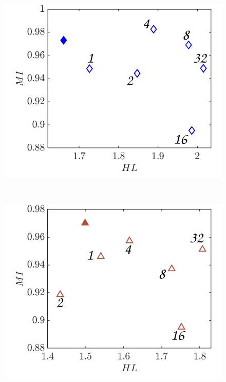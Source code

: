 \documentclass[%
 aip,
 amsmath,amssymb,
 reprint,
]{revtex4-1}
\begin{document}
\begin{figure}
\begin{center}
\begin{minipage}[c]{0.3\linewidth}
			\includegraphics[width=1\linewidth,trim=0.5cm 0cm 0cm 0cm,clip]{Figures/MI_8h_HL_3.png}
		\end{minipage}\\
		\begin{minipage}[c]{0.3\linewidth}
			\includegraphics[width=1\linewidth,trim=0.5cm 0cm 0cm 0cm,clip]{Figures/MI_8h_HL_4.png}
		\end{minipage}
		\begin{minipage}[c]{0.3\linewidth}

\end{minipage}
\end{center}
\end{figure}
\end{document}
